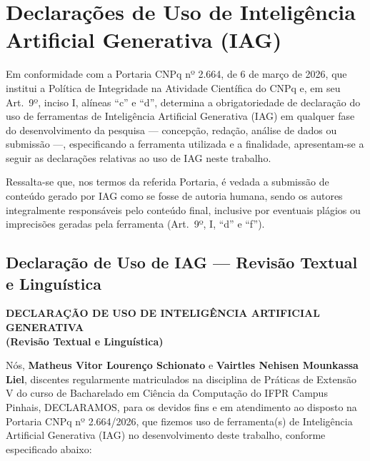 
\chapter{Declarações de Uso de Inteligência Artificial Generativa (IAG)}
\label{apendice_declaracao_iag}

\noindent
Em conformidade com a Portaria CNPq nº 2.664, de 6 de março de 2026, que institui a
Política de Integridade na Atividade Científica do CNPq e, em seu Art.~9º, inciso I,
alíneas ``c'' e ``d'', determina a obrigatoriedade de declaração do uso de ferramentas
de Inteligência Artificial Generativa (IAG) em qualquer fase do desenvolvimento da
pesquisa --- concepção, redação, análise de dados ou submissão ---, especificando a
ferramenta utilizada e a finalidade, apresentam-se a seguir as declarações relativas
ao uso de IAG neste trabalho.

\bigskip
\noindent
Ressalta-se que, nos termos da referida Portaria, é vedada a submissão de conteúdo
gerado por IAG como se fosse de autoria humana, sendo os autores integralmente
responsáveis pelo conteúdo final, inclusive por eventuais plágios ou imprecisões
geradas pela ferramenta (Art.~9º, I, ``d'' e ``f'').


\section{Declaração de Uso de IAG --- Revisão Textual e Linguística}
\label{ap:declaracao_revisao_texto}

\begin{center}
\textbf{\large DECLARAÇÃO DE USO DE INTELIGÊNCIA ARTIFICIAL GENERATIVA}\\
\textbf{(Revisão Textual e Linguística)}
\end{center}

\bigskip
\noindent
Nós, \textbf{Matheus Vitor Lourenço Schionato} e \textbf{Vairtles Nehisen Mounkassa Liel}, discentes regularmente matriculados na disciplina de Práticas de Extensão V do curso de Bacharelado em Ciência da Computação do IFPR Campus Pinhais, DECLARAMOS, para os devidos fins e em atendimento ao disposto na Portaria CNPq nº 2.664/2026, que fizemos uso de ferramenta(s) de Inteligência Artificial Generativa (IAG) no desenvolvimento deste trabalho, conforme especificado abaixo:

